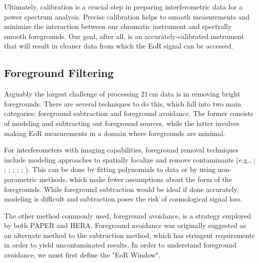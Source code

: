 Ultimately, calibration is a crucial step in preparing interferometric data for a power spectrum analysis. Precise calibration helps to smooth measurements and minimize the interaction between our chromatic instrument and spectrally smooth foregrounds. Our goal, after all, is an accurately-calibrated instrument that will result in cleaner data from which the EoR signal can be accessed.

\subsection{Foreground Filtering}
\label{sec:fg_intro}

Arguably the largest challenge of processing $21$\,cm data is in removing bright foregrounds. There are several techniques to do this, which fall into two main categories: foreground subtraction and foreground avoidance. The former consists of modeling and subtracting out foreground sources, while the latter involves making EoR measurements in a domain where foregrounds are minimal. 

For interferometers with imaging capabilities, foreground removal techniques include modeling approaches to spatially localize and remove contaminants (e.g., \citealt{santos_et_al2005}; \citealt{wang_et_al2006}; \citealt{jelic_et_al2008}; \citealt{liu_et_al2009}; \citealt{bowman_et_al2009}; \citealt{harker_et_al2009}; \citealt{chapman_et_al2016}). This can be done by fitting polynomials to data or by using non-parametric methods, which make fewer assumptions about the form of the foregrounds. While foreground subtraction would be ideal if done accurately, modeling is difficult and subtraction poses the risk of cosmological signal loss.

The other method commonly used, foreground avoidance, is a strategy employed by both PAPER and HERA. Foreground avoidance was originally suggested as an alternate method to the subtraction method, which has stringent requirements in order to yield uncontaminated results. In order to understand foreground avoidance, we must first define the "EoR Window".

